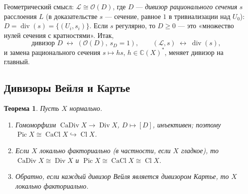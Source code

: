 \documentclass[11pt,a4paper]{article}
\theoremstyle{plain}
\newtheorem{theorem}{Теорема}[section]
\theoremstyle{definition}
\theoremstyle{remark}
\renewcommand{\C}{\mathbb{C}}
\newcommand{\cO}{\mathcal{O}}
\newcommand{\cL}{\mathcal{L}}
\DeclareMathOperator{\Pic}{Pic}
\DeclareMathOperator{\Cl}{Cl}
\DeclareMathOperator{\Div}{Div}
\DeclareMathOperator{\CaDiv}{CaDiv}
\DeclareMathOperator{\CaCl}{CaCl}
\DeclareMathOperator{\divv}{div}
\begin{document}
Геометрический смысл: $\cL\cong \cO(D)$, где $D$ --- \emph{дивизор рационального сечения} $s$
расслоения $L$ (в доказательстве $s$ --- сечение, равное $1$ в тривиализации над $U_0$):
$D=\divv(s)=\{(U_i, s_i)\}$. Если $s$ регулярно, то $D\ge 0$ --- это «множество нулей сечения с
кратностями». Итак,
\[
\text{дивизор } D \;\longleftrightarrow\; (\cO(D),\ s_D=1),\qquad
(\cL,s)\;\longleftrightarrow\;\divv(s),
\]
и замена рационального сечения $s\mapsto hs$, $h\in\C(X)^*$, меняет дивизор на главный.

\subsection{Дивизоры Вейля и Картье}

\begin{theorem}\label{thm:Weil=Cartier}
Пусть $X$ нормально.
\begin{enumerate}
\item Гомоморфизм $\CaDiv X\to\Div X$, $D\mapsto[D]$, инъективен; поэтому
$\Pic X\cong\CaCl X\hookrightarrow\Cl X$.
\item Если $X$ локально факториально (в частности, если $X$ гладкое), то
$\CaDiv X\cong\Div X$ и $\Pic X\cong\CaCl X\cong\Cl X$.
\item Обратно, если каждый дивизор Вейля является дивизором Картье, то $X$ локально факториально.
\end{enumerate}
\end{theorem}
\end{document}
